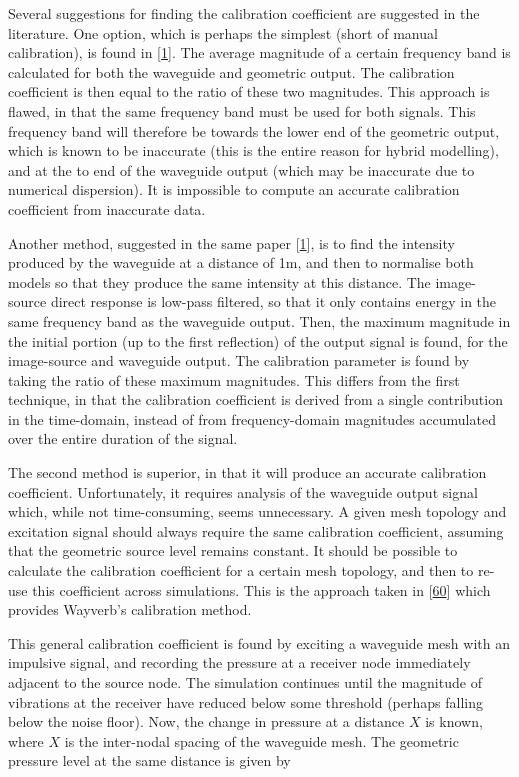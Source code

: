 \documentclass[]{scrreprt}
\begin{document}
Several suggestions for finding the calibration coefficient are
suggested in the literature. One option, which is perhaps the simplest
(short of manual calibration), is found in
{[}\protect\hyperlink{ref-southernux5fspatialux5f2011}{1}{]}. The
average magnitude of a certain frequency band is calculated for both the
waveguide and geometric output. The calibration coefficient is then
equal to the ratio of these two magnitudes. This approach is flawed, in
that the same frequency band must be used for both signals. This
frequency band will therefore be towards the lower end of the geometric
output, which is known to be inaccurate (this is the entire reason for
hybrid modelling), and at the to end of the waveguide output (which may
be inaccurate due to numerical dispersion). It is impossible to compute
an accurate calibration coefficient from inaccurate data.

Another method, suggested in the same paper
{[}\protect\hyperlink{ref-southernux5fspatialux5f2011}{1}{]}, is to find
the intensity produced by the waveguide at a distance of 1m, and then to
normalise both models so that they produce the same intensity at this
distance. The image-source direct response is low-pass filtered, so that
it only contains energy in the same frequency band as the waveguide
output. Then, the maximum magnitude in the initial portion (up to the
first reflection) of the output signal is found, for the image-source
and waveguide output. The calibration parameter is found by taking the
ratio of these maximum magnitudes. This differs from the first
technique, in that the calibration coefficient is derived from a single
contribution in the time-domain, instead of from frequency-domain
magnitudes accumulated over the entire duration of the signal.

The second method is superior, in that it will produce an accurate
calibration coefficient. Unfortunately, it requires analysis of the
waveguide output signal which, while not time-consuming, seems
unnecessary. A given mesh topology and excitation signal should always
require the same calibration coefficient, assuming that the geometric
source level remains constant. It should be possible to calculate the
calibration coefficient for a certain mesh topology, and then to re-use
this coefficient across simulations. This is the approach taken in
{[}\protect\hyperlink{ref-siltanenux5ffinite-differenceux5f2013}{60}{]}
which provides Wayverb's calibration method.

This general calibration coefficient is found by exciting a waveguide
mesh with an impulsive signal, and recording the pressure at a receiver
node immediately adjacent to the source node. The simulation continues
until the magnitude of vibrations at the receiver have reduced below
some threshold (perhaps falling below the noise floor). Now, the change
in pressure at a distance \(X\) is known, where \(X\) is the inter-nodal
spacing of the waveguide mesh. The geometric pressure level at the same
distance is given by
\end{document}
